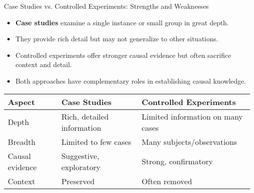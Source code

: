 \documentclass{beamer}
\begin{document}
\begin{frame}{Case Studies vs. Controlled Experiments: Strengths and Weaknesses}
    \begin{itemize}
        \item \textbf{Case studies} examine a single instance or small group in great depth.
        \item They provide rich detail but may not generalize to other situations.
        \item Controlled experiments offer stronger causal evidence but often sacrifice context and detail.
        \item Both approaches have complementary roles in establishing causal knowledge.
    \end{itemize}
    
    \begin{table}
        \scriptsize
        \centering
        \begin{tabular}{|l|p{3.5cm}|p{3.5cm}|}
            \hline
            \textbf{Aspect} & \textbf{Case Studies} & \textbf{Controlled Experiments} \\
            \hline
            Depth & Rich, detailed information & Limited information on many cases \\
            \hline
            Breadth & Limited to few cases & Many subjects/observations \\
            \hline
            Causal evidence & Suggestive, exploratory & Strong, confirmatory \\
            \hline
            Context & Preserved & Often removed \\
            \hline
        \end{tabular}
    \end{table}
\end{frame}
\end{document}
